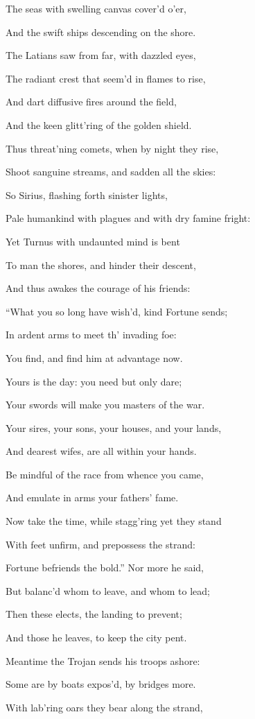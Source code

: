 The seas with swelling canvas cover’d o’er,

And the swift ships descending on the shore.

The Latians saw from far, with dazzled eyes,

The radiant crest that seem’d in flames to rise,

And dart diffusive fires around the field,

And the keen glitt’ring of the golden shield.

Thus threat’ning comets, when by night they rise,

Shoot sanguine streams, and sadden all the skies:

So Sirius, flashing forth sinister lights,

Pale humankind with plagues and with dry famine fright:

Yet Turnus with undaunted mind is bent

To man the shores, and hinder their descent,

And thus awakes the courage of his friends:

“What you so long have wish’d, kind Fortune sends;

In ardent arms to meet th’ invading foe:

You find, and find him at advantage now.

Yours is the day: you need but only dare;

Your swords will make you masters of the war.

Your sires, your sons, your houses, and your lands,

And dearest wifes, are all within your hands.

Be mindful of the race from whence you came,

And emulate in arms your fathers’ fame.

Now take the time, while stagg’ring yet they stand

With feet unfirm, and prepossess the strand:

Fortune befriends the bold.” Nor more he said,

But balanc’d whom to leave, and whom to lead;

Then these elects, the landing to prevent;

And those he leaves, to keep the city pent.

Meantime the Trojan sends his troops ashore:

Some are by boats expos’d, by bridges more.

With lab’ring oars they bear along the strand,

